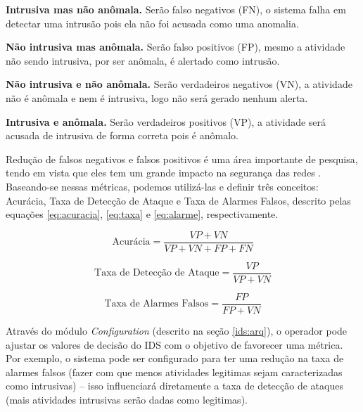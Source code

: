\textbf{Intrusiva mas não anômala.} Serão falso negativos (FN), o sistema falha em detectar uma intrusão pois ela não foi acusada como uma anomalia. 


\textbf{Não intrusiva mas anômala.} Serão falso positivos (FP), mesmo a atividade não sendo intrusiva, por ser anômala, 
é alertado como intrusão.

\textbf{Não intrusiva e não anômala.} Serão verdadeiros negativos (VN), a atividade não é anômala e nem é intrusiva, logo não será gerado nenhum alerta.

\textbf{Intrusiva e anômala.} Serão verdadeiros positivos (VP), a atividade será acusada de intrusiva de forma correta pois é anômalo.

Redução de falsos negativos e falsos positivos é uma área importante de pesquisa, tendo em vista que eles tem um grande impacto na segurança das redes \cite{Kunal2019}. Baseando-se nessas métricas, podemos utilizá-las e definir três conceitos: Acurácia, Taxa de Detecção de Ataque e Taxa de Alarmes Falsos, descrito pelas equações \ref{eq:acuracia}, \ref{eq:taxa} e \ref{eq:alarme}, respectivamente.

\begin{equation}
    \text{Acurácia} = \frac{VP + VN}{VP + VN + FP + FN}
    \label{eq:acuracia}
\end{equation}

\begin{equation}
    \text{Taxa de Detecção de Ataque} = \frac{VP}{VP + VN}
    \label{eq:taxa}
\end{equation}

\begin{equation}
    \text{Taxa de Alarmes Falsos} = \frac{FP}{FP + VN}
    \label{eq:alarme}
\end{equation}

Através do módulo \textit{Configuration} (descrito na seção \ref{ids:arq}), o operador pode ajustar os valores de decisão do IDS com o objetivo de favorecer uma métrica. Por exemplo, o sistema pode ser configurado para ter uma redução na taxa de alarmes falsos (fazer com que menos atividades legitimas sejam caracterizadas como intrusivas) -- isso influenciará diretamente a taxa de detecção de ataques (mais atividades intrusivas serão dadas como legitimas).

